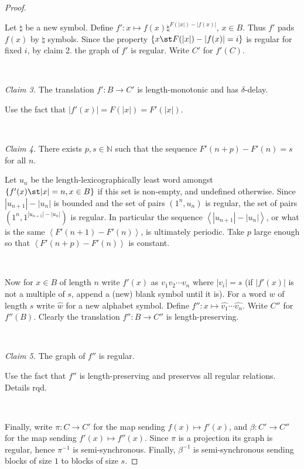 \begin{proof}
\

Let $\natural$ be a new symbol. Define $f':x \mapsto f(x) \natural^{F(|x|) - |f(x)|}$, $x \in B$. Thus $f'$ pads 
$f(x)$ by $\natural$ symbols. Since the property $\{x \st F(|x|)-|f(x)| = i\}$ is regular for fixed $i$, 
by claim 2. the graph of $f'$ is regular. Write $C'$ for $f'(C)$.

\

\noindent
{\em Claim 3.} The translation $f':B \to C'$ is length-monotonic and has $\delta$-delay.

Use the fact that $|f'(x)| = F(|x|) = F'(|x|)$.

\

\noindent
{\em Claim 4.} There exists $p,s \in \mathbb{N}$ such that the sequence  $F'(n+p) - F'(n) = s$ for all $n$.

Let $u_n$ be the length-lexicographically least word amongst $\{f'(x) \st |x| = n, x \in B\}$ 
if this set is non-empty, and undefined otherwise. 
Since  $|u_{n+1}| - |u_n|$ is bounded and the set of pairs $(1^n,u_n)$ is regular,
the set of pairs $(1^n,1^{|u_{n+1}| - |u_n|})$ is regular. In particular
the sequence $\left<|u_{n+1}|-|u_n|\right>$, or what is the same $\left<F'(n+1) - F'(n)\right>$,
is ultimately periodic.  Take $p$ large enough so that $\left<F'(n+p) -F'(n)\right>$ is constant.

\

Now for $x \in B$ of length $n$ write $f'(x) $ as $v_1 v_2 \cdots v_n$ where $|v_i| = s$ (if $|f'(x)|$ is not a multiple of $s$, append
a (new) blank symbol until it is). For a word $w$ of length $s$ write $\widehat{w}$ for a new alphabet symbol. 
Define $f'':x \mapsto \widehat{v_1} \cdots \widehat{v_n}$. Write $C''$ for $f''(B)$. Clearly 
the translation $f'':B \to C''$ is length-preserving.

\

\noindent
{\em Claim 5.} The graph of $f''$ is regular. 

Use the fact that $f''$ is length-preserving and preserves all regular relations. Details rqd. %

\


Finally, write $\pi:C \to C'$ for the map sending $f(x) \mapsto f'(x)$, and $\beta:C' \to C''$ for the map sending $f'(x) \mapsto f''(x)$.
Since $\pi$ is a projection its graph is regular, hence $\pi^{-1}$ is semi-synchronous.
Finally, $\beta^{-1}$ is semi-synchronous sending blocks of size $1$ to blocks of size $s$.
\end{proof}
